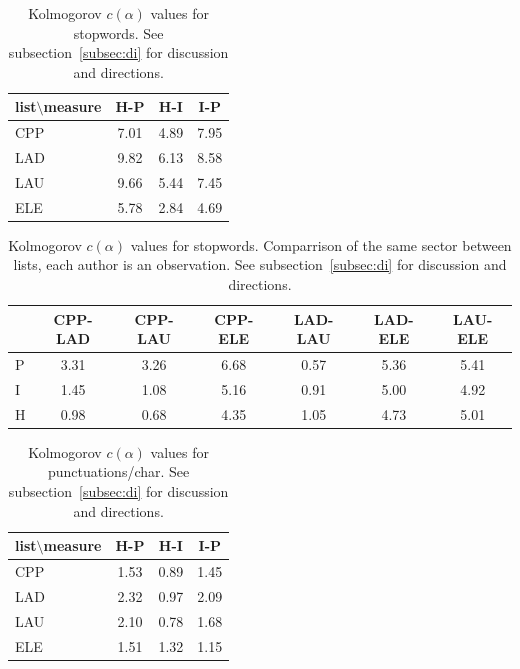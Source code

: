 \documentclass[%
 aip,
 jmp,%
 amsmath,amssymb,
 reprint,%
]{revtex4-1}
\begin{document}
\begin{table}
  \centering
    \small
\setlength{\tabcolsep}{.26667em}
  \begin{tabular}{|l|| c|c|c|}\hline
list$\setminus$measure & H-P & H-I & I-P \\\hline
CPP & 7.01 & 4.89 & 7.95 \\\hline
LAD & 9.82 & 6.13 & 8.58 \\\hline
LAU & 9.66 & 5.44 & 7.45 \\\hline
ELE & 5.78 & 2.84 & 4.69 \\\hline
  \end{tabular}
  \caption{Kolmogorov $c(\alpha)$ values for stopwords. See subsection~\ref{subsec:di} for discussion and directions.}
  \label{tab:kolSw}
\end{table}


\begin{table}
  \centering
    \small
\setlength{\tabcolsep}{.06667em}
  \begin{tabular}{|l|| c|c|c|c|c|c|}\hline
 & CPP-LAD & CPP-LAU & CPP-ELE & LAD-LAU & LAD-ELE & LAU-ELE \\\hline
P & 3.31 & 3.26 & 6.68 & 0.57 & 5.36 & 5.41 \\\hline
I & 1.45 & 1.08 & 5.16 & 0.91 & 5.00 & 4.92 \\\hline
H & 0.98 & 0.68 & 4.35 & 1.05 & 4.73 & 5.01 \\\hline
  \end{tabular}
  \caption{Kolmogorov $c(\alpha)$ values for stopwords. Comparrison of the same sector between lists, each author is an observation. See subsection~\ref{subsec:di} for discussion and directions.}
  \label{tab:kolSwInter}
\end{table}



\begin{table}
  \centering
    \small
\setlength{\tabcolsep}{.26667em}
  \begin{tabular}{|l|| c|c|c|}\hline
list$\setminus$measure & H-P & H-I & I-P \\\hline
CPP & 1.53 & 0.89 & 1.45 \\\hline
LAD & 2.32 & 0.97 & 2.09 \\\hline
LAU & 2.10 & 0.78 & 1.68 \\\hline
ELE & 1.51 & 1.32 & 1.15 \\\hline
  \end{tabular}
  \caption{Kolmogorov $c(\alpha)$ values for punctuations/char. See subsection~\ref{subsec:di} for discussion and directions.}
  \label{tab:kolPct}
\end{table}
\end{document}
